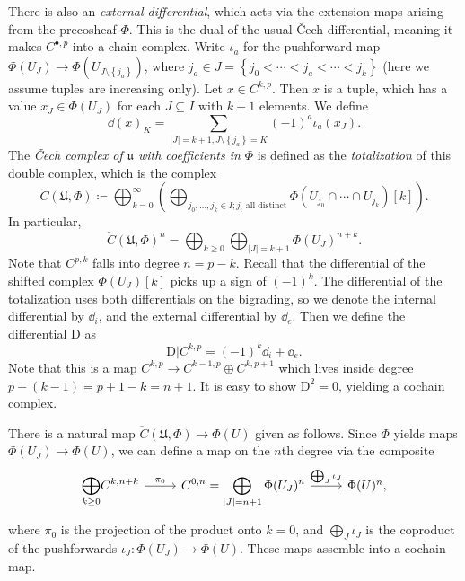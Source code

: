 There is also an \emph{external differential}, which acts via the extension maps arising from the precosheaf $\Phi $. This is the dual of the usual \v{C}ech differential, meaning it makes $C^{\bullet, p} $ into a chain complex. Write $\iota _a$ for the pushforward map $\Phi (U_J) \to \Phi (U_{J\setminus \left\{ j_a \right\} } )$, where $j_a\in J = \left\{ j_0 < \cdots < j_a < \cdots < j_{k}  \right\} $ (here we assume tuples are increasing only). Let $x\in C^{k,p} $. Then $x$ is a tuple, which has a value $x_J\in \Phi (U_J)$ for each $J\subseteq I$ with $k+1$ elements. We define
\[
	\dd (x)_K = \sum_{\left| J \right| =k+1, J\setminus \left\{ j_a \right\} =K} (-1)^{a} \iota _a(x_{J} )
.\]
The \emph{\v{C}ech complex of $\mathfrak{u} $ with coefficients in $\Phi $} is defined as the \emph{totalization} of this double complex, which is the complex
\[
	\check{C}(\mathfrak{U} ,\Phi ) \coloneqq \bigoplus_{k=0} ^{\infty } \left( \bigoplus_{j_0, \ldots , j_k\in I ; j_i\text{ all distinct} } \Phi (U_{j_0} \cap \cdots \cap U_{j_k} )[k]  \right) 
.\]
In particular,
\[
	\check{C}(\mathfrak{U} ,\Phi )^n = \bigoplus_{k\geq 0} \bigoplus_{\left| J \right| =k+1} \Phi (U_J)^{n+k} 
.\]
Note that $C^{p,k} $ falls into degree $n=p-k$. Recall that the differential of the shifted complex $\Phi (U_J)[k]$ picks up a sign of $(-1)^k$. The differential of the totalization uses both differentials on the bigrading, so we denote the internal differential by $\dd_i$, and the external differential by $\dd _e$. Then we define the differential $\mathrm{D} $ as
\[
	\mathrm{D} |C^{k,p} =(-1)^k\dd _i + \dd _e
.\]
Note that this is a map $C^{k,p} \to C^{k-1,p}\oplus C^{k,p+1} $ which lives inside degree $p - (k - 1) = p + 1 - k = n+1$. It is easy to show $\mathrm{D} ^2=0$, yielding a cochain complex.

There is a natural map $\check{C}(\mathfrak{U} ,\Phi ) \to \Phi (U)$ given as follows. Since $\Phi $ yields maps $\Phi (U_J) \to \Phi (U)$, we can define a map on the $n$th degree via the composite
\[\begin{tikzcd}[row sep = 2.5em, column sep = 2.5em]
	\displaystyle{\bigoplus_{k\geq 0} } C^{k,n+k} \ar[" \pi _0 ", r]  & \displaystyle{C^{0,n} =\bigoplus_{\left| J \right| =n+1} \Phi(U_J)^n}\ar[" \bigoplus_{J} \iota _J ", r] & \Phi (U)^n,
\end{tikzcd}\]
where $\pi _0$ is the projection of the product onto $k=0$, and $\bigoplus_{J} \iota _J$ is the coproduct of the pushforwards $\iota _J : \Phi (U_J) \to \Phi (U)$. These maps assemble into a cochain map.

